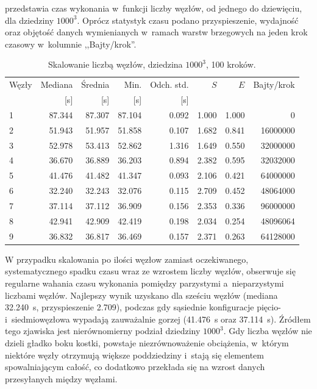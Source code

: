  przedstawia czas wykonania w~funkcji liczby węzłów, od
jednego do dziewięciu, dla dziedziny $1000^3$. Oprócz statystyk czasu podano
przyspieszenie, wydajność oraz objętość danych wymienianych w~ramach warstw
brzegowych na jeden krok czasowy w~kolumnie ,,Bajty/krok''.

\begin{table}[htbp]
\centering
\caption{Skalowanie liczbą węzłów, dziedzina $1000^3$, \num{100} kroków.}
\label{tab:node-scaling}
\begin{tabular}{lrrrrrrr}
\toprule
Węzły & Mediana & Średnia & Min. & Odch. std. & $S$ & $E$ & Bajty/krok \\
& [s] & [s] & [s] & [s] & & & \\
\midrule
\num{1}  & \num{87.344} & \num{87.307} & \num{87.104} & \num{0.092} & \num{1.000} & \num{1.000} & \num{0} \\
\num{2}  & \num{51.943} & \num{51.957} & \num{51.858} & \num{0.107} & \num{1.682} & \num{0.841} & \num{16000000} \\
\num{3}  & \num{52.978} & \num{53.413} & \num{52.862} & \num{1.316} & \num{1.649} & \num{0.550} & \num{32000000} \\
\num{4}  & \num{36.670} & \num{36.889} & \num{36.203} & \num{0.894} & \num{2.382} & \num{0.595} & \num{32032000} \\
\num{5}  & \num{41.476} & \num{41.482} & \num{41.347} & \num{0.093} & \num{2.106} & \num{0.421} & \num{64000000} \\
\num{6}  & \num{32.240} & \num{32.243} & \num{32.076} & \num{0.115} & \num{2.709} & \num{0.452} & \num{48064000} \\
\num{7}  & \num{37.114} & \num{37.112} & \num{36.909} & \num{0.156} & \num{2.353} & \num{0.336} & \num{96000000} \\
\num{8}  & \num{42.941} & \num{42.909} & \num{42.419} & \num{0.198} & \num{2.034} & \num{0.254} & \num{48096064} \\
\num{9}  & \num{36.832} & \num{36.817} & \num{36.469} & \num{0.157} & \num{2.371} & \num{0.263} & \num{64128000} \\
\bottomrule
\end{tabular}
\end{table}

W przypadku skalowania po ilości węzłow zamiast
oczekiwanego, systematycznego spadku czasu wraz ze wzrostem liczby węzłów,
obserwuje się regularne wahania czasu wykonania pomiędzy parzystymi
a~nieparzystymi liczbami węzłów. Najlepszy wynik uzyskano dla sześciu węzłów (mediana
\SI{32.240}{\second}, przyspieszenie \num{2.709}), podczas gdy sąsiednie
konfiguracje pięcio- i~siedmiowęzłowa wypadają zauważalnie gorzej
(\SI{41.476}{\second} oraz \SI{37.114}{\second}). Źródłem tego zjawiska jest
nierównomierny podział dziedziny $1000^3$. Gdy liczba węzłów nie dzieli
gładko boku kostki, powstaje niezrównoważenie obciążenia, w~którym niektóre węzły
otrzymują większe poddziedziny i~stają się elementem spowalniającym całość,
co dodatkowo przekłada się na wzrost danych przesyłanych między węzłami.

